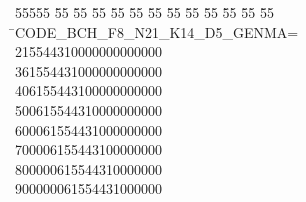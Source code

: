 %
%
\begin{tabbing}
55555 \= 55 \= 55 \= 55 \= 55 \= 55 \= 55 \= 55 \= 55 \= 55 \= 55 \= 55 \= 55 \= \>CODE\_BCH\_F8\_N21\_K14\_D5\_GENMA=\\[0pt]
215544310000000000000\\[0pt]
361554431000000000000\\[0pt]
406155443100000000000\\[0pt]
500615544310000000000\\[0pt]
600061554431000000000\\[0pt]
700006155443100000000\\[0pt]
800000615544310000000\\[0pt]
900000061554431000000\\[0pt]

\end{tabbing}
